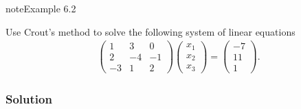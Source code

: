 \documentclass[letterpaper,10pt,english]{jupyterBook}
\begin{document}
\begin{sphinxadmonition}{note}{Example 6.2}

\sphinxAtStartPar
Use Crout’s method to solve the following system of linear equations
\begin{align*}
    \begin{pmatrix}
        1 & 3 & 0 \\
        2 & -4 & -1 \\
        -3 & 1 & 2
    \end{pmatrix}
    \begin{pmatrix} x_1 \\ x_2 \\ x_3 \end{pmatrix}=
    \begin{pmatrix} -7 \\ 11 \\ 1 \end{pmatrix}.
\end{align*}\subsubsection*{Solution}


\end{sphinxadmonition}
\end{document}

